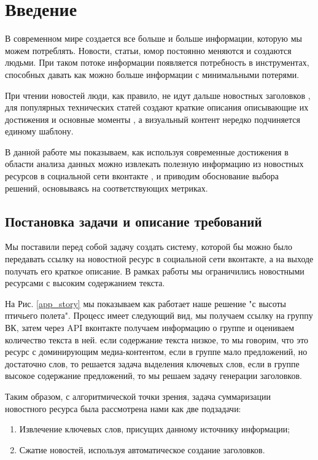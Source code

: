 \documentclass[aps,%
12pt,%
final,%
oneside,
onecolumn,%
musixtex, %
superscriptaddress,%
centertags]{article} %
\begin{document}
\section{Введение}
В современном мире создается все больше и больше информации, которую мы можем потреблять.
Новости, статьи, юмор постоянно меняются и создаются людьми. При таком потоке информации
появляется потребность в инструментах, способных давать как можно больше информации
с минимальными потерями.

При чтении новостей люди, как правило, не идут дальше новостных заголовков \cite{jaysondemers2016},
для популярных технических статей создают краткие описания описывающие их достижения
и основные моменты \cite{tldr_arxiv2019, articleessence2019}, а визуальный контент нередко подчиняется единому шаблону.

В данной работе мы показываем, как используя современные достижения в области анализа
данных можно извлекать полезную информацию из новостных ресурсов в социальной сети вконтакте \cite{vk2019},
и приводим обоснование выбора решений, основываясь на соответствующих метриках.

\subsection{Постановка задачи и описание требований}
Мы поставили перед собой задачу создать систему, которой бы можно было передавать ссылку на новостной ресурс в социальной сети вконтакте, а на выходе получать его краткое описание. В рамках работы мы ограничились новостными ресурсами с высоким содержанием текста.

На Рис. \ref{app_story} мы показываем как работает наше решение "с высоты птичьего полета". Процесс имеет следующий вид, мы получаем ссылку на группу ВК, затем через API вконтакте получаем информацию о группе и оцениваем количество текста в ней. если содержание текста низкое, то мы говорим, что это ресурс с доминирующим медиа-контентом, если в группе мало предложений, но достаточно слов, то решается задача выделения ключевых слов, если в группе высокое содержание предложений, то мы решаем задачу генерации заголовков.

Таким образом, с алгоритмической точки зрения, задача суммаризации новостного ресурса была рассмотрена нами как две подзадачи:
\begin{enumerate}
  \item Извлечение ключевых слов, присущих данному источнику информации;
  \item Сжатие новостей, используя автоматическое создание заголовков.
\end{enumerate}
\end{document}
